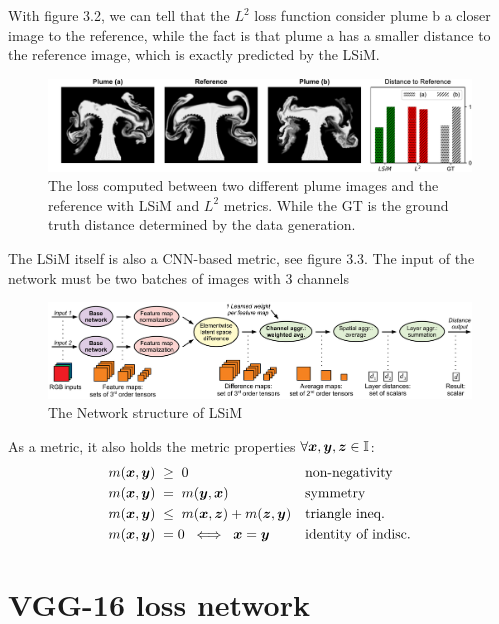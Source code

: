 \documentclass[a4paper,12pt,twoside]{report}
\begin{document}
With figure 3.2, we can tell that the $L^2$ loss function consider plume b a closer image to the reference, while the fact is that plume a has a smaller distance to the reference image, which is exactly predicted by the LSiM.

\begin{figure}
\centering
\includegraphics[width=1.0\textwidth]{Plumes.pdf}
\caption{The loss computed between two different plume images and the reference with LSiM and $L^2$ metrics. While the GT is the ground truth distance determined by the data generation.  }
\end{figure}
The LSiM itself is also a CNN-based metric, see figure 3.3. The input of the network must be two batches of images with 3 channels
\begin{figure}
\centering
\includegraphics[width=1.0\textwidth]{DistanceComputation.pdf}
\caption{The Network structure of LSiM}
\end{figure}

As a metric, it also holds the metric properties $\forall {\bm{x}},{\bm{y}},{\bm{z}} \in {\mathbb{I}}$:
\begin{align}
    m({\bm{x}},{\bm{y}}) \; &\geq \; 0                && \text{non-negativity} \label{eq: NonNeg}\\
    m({\bm{x}},{\bm{y}}) \; &= \; m({\bm{y}},{\bm{x}})              && \text{symmetry} \label{eq: Sym}\\
    m({\bm{x}},{\bm{y}}) \; &\leq \; m({\bm{x}},{\bm{z}}) + m({\bm{z}},{\bm{y}})  && \text{triangle ineq.} \label{eq: TriIneq}\\
    m({\bm{x}},{\bm{y}}) \; &= 0 \; \iff \; {\bm{x}} = {\bm{y}}     && \text{identity of indisc.} \label{eq: IoI}
\end{align}

\section{VGG-16 loss network}
\end{document}
